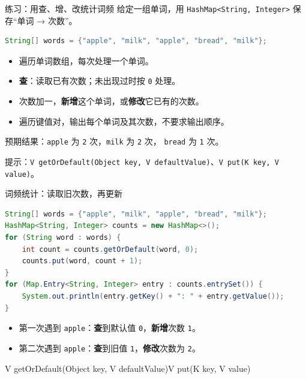 \documentclass[aspectratio=169]{beamer}
\begin{document}
\begin{frame}[fragile]{练习：用查、增、改统计词频}
  给定一组单词，用 \texttt{HashMap<String, Integer>} 保存“单词 → 次数”。
  \begin{lstlisting}[language=Java]
String[] words = {"apple", "milk", "apple", "bread", "milk"};
  \end{lstlisting}
  \begin{itemize}
    \item 遍历单词数组，每次处理一个单词。
    \item \textbf{查}：读取已有次数；未出现过时按 \texttt{0} 处理。
    \item 次数加一，\textbf{新增}这个单词，或\textbf{修改}它已有的次数。
    \item 遍历键值对，输出每个单词及其次数，不要求输出顺序。
  \end{itemize}
  \medskip
  预期结果：\texttt{apple} 为 \texttt{2} 次，\texttt{milk} 为 \texttt{2} 次，
  \texttt{bread} 为 \texttt{1} 次。
  \par\medskip
  提示：\texttt{V getOrDefault(Object key, V defaultValue)}、\texttt{V put(K key, V value)}。
\end{frame}

\begin{frame}[fragile]{词频统计：读取旧次数，再更新}
  \begin{lstlisting}[language=Java]
String[] words = {"apple", "milk", "apple", "bread", "milk"};
HashMap<String, Integer> counts = new HashMap<>();
for (String word : words) {
    int count = counts.getOrDefault(word, 0);
    counts.put(word, count + 1);
}
for (Map.Entry<String, Integer> entry : counts.entrySet()) {
    System.out.println(entry.getKey() + ": " + entry.getValue());
}
  \end{lstlisting}
  \begin{itemize}
    \item 第一次遇到 \texttt{apple}：\textbf{查}到默认值 \texttt{0}，\textbf{新增}次数 \texttt{1}。
    \item 第二次遇到 \texttt{apple}：\textbf{查}到旧值 \texttt{1}，\textbf{修改}次数为 \texttt{2}。
  \end{itemize}
  \medskip
  {\small\ttfamily V getOrDefault(Object key, V defaultValue)\quad V put(K key, V value)}
\end{frame}
\end{document}
